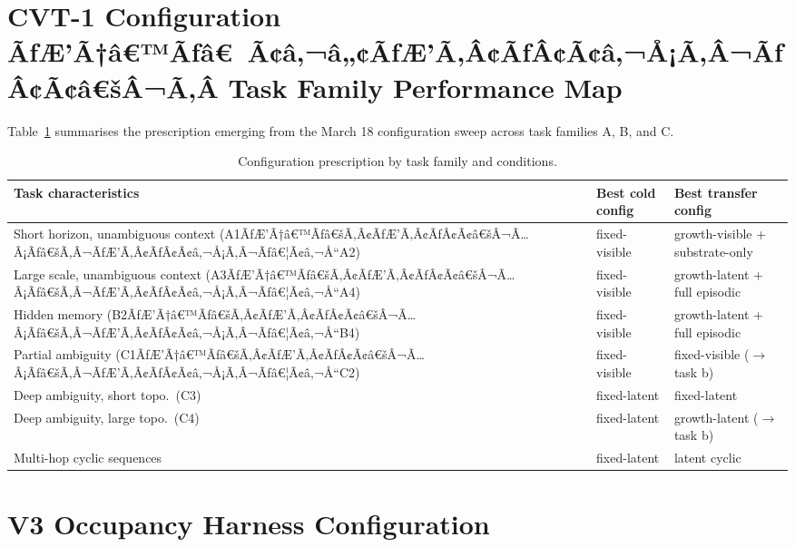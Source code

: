 \documentclass[10pt,twocolumn]{article}
\begin{document}
\appendix

\section{CVT-1 Configuration ÃƒÆ’Ã†â€™Ãƒâ€ Ã¢â‚¬â„¢ÃƒÆ’Ã‚Â¢ÃƒÂ¢Ã¢â‚¬Å¡Ã‚Â¬ÃƒÂ¢Ã¢â€šÂ¬Ã‚Â Task Family Performance Map}
\label{app:config_map}

Table~\ref{tab:config_map} summarises the prescription emerging from the
March 18 configuration sweep across task families A, B, and C.

\begin{table}[h]
\centering
\caption{Configuration prescription by task family and conditions.}
\label{tab:config_map}
\small
\renewcommand{\arraystretch}{1.15}
\begin{tabular}{p{3.0cm}p{2.0cm}p{2.5cm}}
\toprule
Task characteristics & Best cold config & Best transfer config \\
\midrule
Short horizon, unambiguous context (A1ÃƒÆ’Ã†â€™Ãƒâ€šÃ‚Â¢ÃƒÆ’Ã‚Â¢ÃƒÂ¢Ã¢â€šÂ¬Ã…Â¡Ãƒâ€šÃ‚Â¬ÃƒÆ’Ã‚Â¢ÃƒÂ¢Ã¢â‚¬Å¡Ã‚Â¬Ãƒâ€¦Ã¢â‚¬Å“A2)
  & fixed-visible & growth-visible + substrate-only \\
Large scale, unambiguous context (A3ÃƒÆ’Ã†â€™Ãƒâ€šÃ‚Â¢ÃƒÆ’Ã‚Â¢ÃƒÂ¢Ã¢â€šÂ¬Ã…Â¡Ãƒâ€šÃ‚Â¬ÃƒÆ’Ã‚Â¢ÃƒÂ¢Ã¢â‚¬Å¡Ã‚Â¬Ãƒâ€¦Ã¢â‚¬Å“A4)
  & fixed-visible & growth-latent + full episodic \\
Hidden memory (B2ÃƒÆ’Ã†â€™Ãƒâ€šÃ‚Â¢ÃƒÆ’Ã‚Â¢ÃƒÂ¢Ã¢â€šÂ¬Ã…Â¡Ãƒâ€šÃ‚Â¬ÃƒÆ’Ã‚Â¢ÃƒÂ¢Ã¢â‚¬Å¡Ã‚Â¬Ãƒâ€¦Ã¢â‚¬Å“B4)
  & fixed-visible & growth-latent + full episodic \\
Partial ambiguity (C1ÃƒÆ’Ã†â€™Ãƒâ€šÃ‚Â¢ÃƒÆ’Ã‚Â¢ÃƒÂ¢Ã¢â€šÂ¬Ã…Â¡Ãƒâ€šÃ‚Â¬ÃƒÆ’Ã‚Â¢ÃƒÂ¢Ã¢â‚¬Å¡Ã‚Â¬Ãƒâ€¦Ã¢â‚¬Å“C2)
  & fixed-visible & fixed-visible ($\to$ task b) \\
Deep ambiguity, short topo.\ (C3)
  & fixed-latent & fixed-latent \\
Deep ambiguity, large topo.\ (C4)
  & fixed-latent & growth-latent ($\to$ task b) \\
Multi-hop cyclic sequences
  & fixed-latent & latent cyclic \\
\bottomrule
\end{tabular}
\end{table}

\section{V3 Occupancy Harness Configuration}
\label{app:v3_config}
\end{document}
